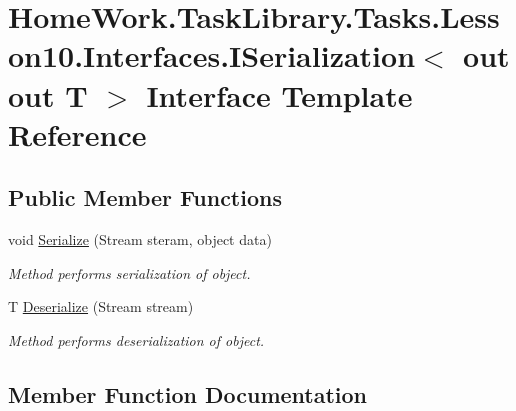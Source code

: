 \hypertarget{interface_home_work_1_1_task_library_1_1_tasks_1_1_lesson10_1_1_interfaces_1_1_i_serialization}{}\section{Home\+Work.\+Task\+Library.\+Tasks.\+Lesson10.\+Interfaces.\+I\+Serialization$<$ out out T $>$ Interface Template Reference}
\label{interface_home_work_1_1_task_library_1_1_tasks_1_1_lesson10_1_1_interfaces_1_1_i_serialization}
\subsection*{Public Member Functions}
\begin{DoxyCompactItemize}
\item 
void \mbox{\hyperlink{interface_home_work_1_1_task_library_1_1_tasks_1_1_lesson10_1_1_interfaces_1_1_i_serialization_aff57c2bdff269d6218fca90b2a341699}{Serialize}} (Stream steram, object data)
\begin{DoxyCompactList}\small\item\em Method performs serialization of object. \end{DoxyCompactList}\item 
T \mbox{\hyperlink{interface_home_work_1_1_task_library_1_1_tasks_1_1_lesson10_1_1_interfaces_1_1_i_serialization_afd1abd3858e9984461127442c06edc05}{Deserialize}} (Stream stream)
\begin{DoxyCompactList}\small\item\em Method performs deserialization of object. \end{DoxyCompactList}\end{DoxyCompactItemize}


\subsection{Member Function Documentation}
\mbox{\label{interface_home_work_1_1_task_library_1_1_tasks_1_1_lesson10_1_1_interfaces_1_1_i_serialization_afd1abd3858e9984461127442c06edc05}} 
